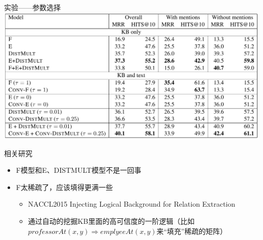 \documentclass[color=usenames,dvipsnames]{beamer}
\begin{document}
\begin{frame}{实验——参数选择}
   \centering\includegraphics[width=0.85\hsize]{pic/test.png}

  \begin{itemize}\footnotesize
  \end{itemize}
\end{frame}


\begin{frame}{相关研究}
  \begin{itemize}
  \item F模型和E、DISTMULT模型不是一回事
   \item F太稀疏了，应该填得更满一些
   \begin{itemize}
  \item NACCL2015 Injecting Logical Background for Relation Extraction
  \item 通过自动的挖掘KB里面的高可信度的一阶逻辑（比如$professorAt(x,y)\Rightarrow emplyeeAt(x,y)$来“填充”稀疏的矩阵）
 \end{itemize}
 
  \end{itemize}

 

\end{frame}
\end{document}
